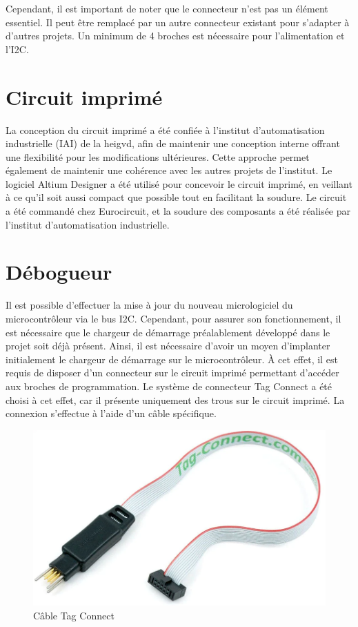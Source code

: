 Cependant, il est important de noter que le connecteur n'est pas un élément essentiel. Il peut être remplacé par un autre connecteur existant pour s'adapter à d'autres projets. Un minimum de 4 broches est nécessaire pour l'alimentation et l'I2C.

\section{Circuit imprimé}

La conception du circuit imprimé a été confiée à l'institut d'automatisation industrielle (IAI) de la \gls{heigvd}, afin de maintenir une conception interne offrant une flexibilité pour les modifications ultérieures.
Cette approche permet également de maintenir une cohérence avec les autres projets de l'institut.
Le logiciel Altium Designer a été utilisé pour concevoir le circuit imprimé, en veillant à ce qu'il soit aussi compact que possible tout en facilitant la soudure.
Le circuit a été commandé chez Eurocircuit, et la soudure des composants a été réalisée par l'institut d'automatisation industrielle.

\section{Débogueur}

Il est possible d'effectuer la mise à jour du nouveau micrologiciel du microcontrôleur via le bus I2C.
Cependant, pour assurer son fonctionnement, il est nécessaire que le chargeur de démarrage préalablement développé dans le projet soit déjà présent.
Ainsi, il est nécessaire d'avoir un moyen d'implanter initialement le chargeur de démarrage sur le microcontrôleur.
À cet effet, il est requis de disposer d'un connecteur sur le circuit imprimé permettant d'accéder aux broches de programmation.
Le système de connecteur Tag Connect a été choisi à cet effet, car il présente uniquement des trous sur le circuit imprimé.
La connexion s'effectue à l'aide d'un câble spécifique.

\begin{figure}[H]
    \centering
    \includegraphics[scale=0.2]{./assets/figures/tag_connect.png}
    \caption{\cite{tag_connect} Câble Tag Connect}
\end{figure}

